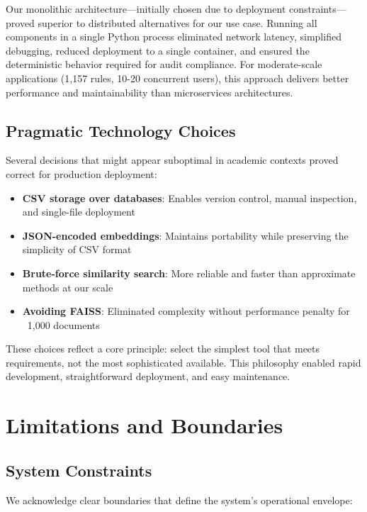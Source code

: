 Our monolithic architecture—initially chosen due to deployment constraints—proved superior to distributed alternatives for our use case. Running all components in a single Python process eliminated network latency, simplified debugging, reduced deployment to a single container, and ensured the deterministic behavior required for audit compliance. For moderate-scale applications (1,157 rules, 10-20 concurrent users), this approach delivers better performance and maintainability than microservices architectures.

\subsection{Pragmatic Technology Choices}

Several decisions that might appear suboptimal in academic contexts proved correct for production deployment:

\begin{itemize}[leftmargin=*,itemsep=2pt,topsep=2pt]
  \item \textbf{CSV storage over databases}: Enables version control, manual inspection, and single-file deployment
  \item \textbf{JSON-encoded embeddings}: Maintains portability while preserving the simplicity of CSV format
  \item \textbf{Brute-force similarity search}: More reliable and faster than approximate methods at our scale
  \item \textbf{Avoiding FAISS}: Eliminated complexity without performance penalty for ~1,000 documents
\end{itemize}

These choices reflect a core principle: select the simplest tool that meets requirements, not the most sophisticated available. This philosophy enabled rapid development, straightforward deployment, and easy maintenance.

\section{Limitations and Boundaries}

\subsection{System Constraints}

We acknowledge clear boundaries that define the system's operational envelope:


